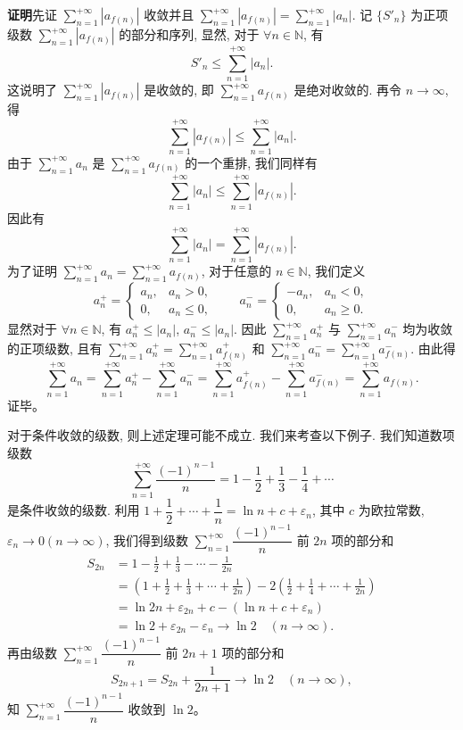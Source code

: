 \documentclass[UTF8,12pt,a4paper,fontset=fandol]{ctexart}
\begin{document}
\noindent\textbf{证明}\quad 先证 $\sum\limits_{n=1}^{+\infty}|a_{f(n)}|$ 收敛并且 $\sum\limits_{n=1}^{+\infty}|a_{f(n)}|=\sum\limits_{n=1}^{+\infty}|a_n|$. 记 $\{S'_n\}$ 为正项级数 $\sum\limits_{n=1}^{+\infty}|a_{f(n)}|$ 的部分和序列, 显然, 对于 $\forall n\in\mathbb{N}$, 有
\[
  S'_n\leq\sum_{n=1}^{+\infty}|a_n|.
\]
这说明了 $\sum\limits_{n=1}^{+\infty}|a_{f(n)}|$ 是收敛的, 即 $\sum\limits_{n=1}^{+\infty}a_{f(n)}$ 是绝对收敛的. 再令 $n\to\infty$, 得
\[
  \sum_{n=1}^{+\infty}|a_{f(n)}|\leq\sum_{n=1}^{+\infty}|a_n|.
\]
由于 $\sum\limits_{n=1}^{+\infty}a_n$ 是 $\sum\limits_{n=1}^{+\infty}a_{f(n)}$ 的一个重排, 我们同样有
\[
  \sum_{n=1}^{+\infty}|a_n|\leq\sum_{n=1}^{+\infty}|a_{f(n)}|.
\]
因此有
\[
  \sum_{n=1}^{+\infty}|a_n|=\sum_{n=1}^{+\infty}|a_{f(n)}|.
\]
为了证明 $\sum\limits_{n=1}^{+\infty}a_n=\sum\limits_{n=1}^{+\infty}a_{f(n)}$, 对于任意的 $n\in\mathbb{N}$, 我们定义
\[
  a_n^+=
  \begin{cases}
    a_n, & a_n>0,\\
    0, & a_n\leq0,
  \end{cases}
  \qquad
  a_n^-=
  \begin{cases}
    -a_n, & a_n<0,\\
    0, & a_n\geq0.
  \end{cases}
  \tag{9.4.1}
\]
显然对于 $\forall n\in\mathbb{N}$, 有 $a_n^+\leq|a_n|$, $a_n^-\leq|a_n|$. 因此 $\sum\limits_{n=1}^{+\infty}a_n^+$ 与 $\sum\limits_{n=1}^{+\infty}a_n^-$ 均为收敛的正项级数, 且有 $\sum\limits_{n=1}^{+\infty}a_n^+=\sum\limits_{n=1}^{+\infty}a_{f(n)}^+$ 和 $\sum\limits_{n=1}^{+\infty}a_n^-=\sum\limits_{n=1}^{+\infty}a_{f(n)}^-$. 由此得
\[
  \sum_{n=1}^{+\infty}a_n
  =\sum_{n=1}^{+\infty}a_n^+-\sum_{n=1}^{+\infty}a_n^-
  =\sum_{n=1}^{+\infty}a_{f(n)}^+-\sum_{n=1}^{+\infty}a_{f(n)}^-
  =\sum_{n=1}^{+\infty}a_{f(n)}.
\]
证毕。

对于条件收敛的级数, 则上述定理可能不成立. 我们来考查以下例子. 我们知道数项级数
\[
  \sum_{n=1}^{+\infty}\frac{(-1)^{n-1}}{n}=1-\frac12+\frac13-\frac14+\cdots
\]
是条件收敛的级数. 利用 $1+\dfrac12+\cdots+\dfrac1n=\ln n+c+\varepsilon_n$, 其中 $c$ 为欧拉常数, $\varepsilon_n\to0(n\to\infty)$, 我们得到级数 $\sum\limits_{n=1}^{+\infty}\dfrac{(-1)^{n-1}}{n}$ 前 $2n$ 项的部分和
\[
\begin{aligned}
  S_{2n}
  &=1-\frac12+\frac13-\cdots-\frac1{2n}\\
  &=\left(1+\frac12+\frac13+\cdots+\frac1{2n}\right)-2\left(\frac12+\frac14+\cdots+\frac1{2n}\right)\\
  &=\ln2n+\varepsilon_{2n}+c-(\ln n+c+\varepsilon_n)\\
  &=\ln2+\varepsilon_{2n}-\varepsilon_n\to\ln2\quad(n\to\infty).
\end{aligned}
\]
再由级数 $\sum\limits_{n=1}^{+\infty}\dfrac{(-1)^{n-1}}{n}$ 前 $2n+1$ 项的部分和
\[
  S_{2n+1}=S_{2n}+\frac1{2n+1}\to\ln2\quad(n\to\infty),
\]
知 $\sum\limits_{n=1}^{+\infty}\dfrac{(-1)^{n-1}}{n}$ 收敛到 $\ln2$。
\end{document}
